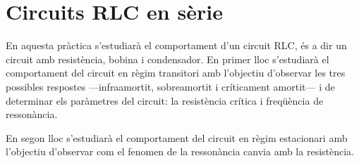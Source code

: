 \chapter{Circuits RLC en sèrie}
\begin{resum}
En aquesta pràctica s'estudiarà el comportament d'un circuit RLC, és a dir un circuit amb resistència, bobina i condensador. En primer lloc s'estudiarà el comportament del circuit en règim transitori amb l'objectiu d'observar les tres possibles respostes ---infraamortit, sobreamortit i críticament amortit--- i de determinar els paràmetres del circuit: la resistència crítica i freqüència de ressonància. 

En segon lloc s'estudiarà el comportament del circuit en règim estacionari amb l'objectiu d'observar com el fenomen de la ressonància canvia amb la resistència.  
\end{resum}

